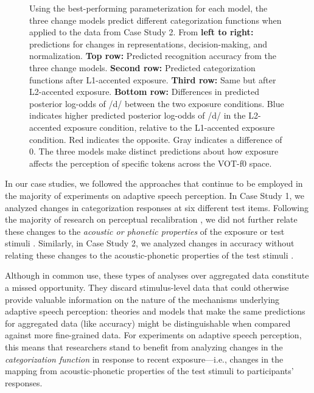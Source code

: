 \documentclass[
  11pt,
  man,floatsintext]{apa6}
\begin{document}
\begin{figure}
{}

\caption{Using the best-performing parameterization for each model, the three change models predict different categorization functions when applied to the data from Case Study 2. From \textbf{left to right:} predictions for changes in representations, decision-making, and normalization. \textbf{Top row:} Predicted recognition accuracy from the three change models. \textbf{Second row:} Predicted categorization functions after L1-accented exposure. \textbf{Third row:} Same but after L2-accented exposure. \textbf{Bottom row:} Differences in predicted posterior log-odds of /d/ between the two exposure conditions. Blue indicates higher predicted posterior log-odds of /d/ in the L2-accented exposure condition, relative to the L1-accented exposure condition. Red indicates the opposite. Gray indicates a difference of 0. The three models make distinct predictions about how exposure affects the perception of specific tokens across the VOT-f0 space.}\label{fig:show-model-categorization-3D-plots-best-performing}
\end{figure}

In our case studies, we followed the approaches that continue to be employed in the majority of experiments on adaptive speech perception. In Case Study 1, we analyzed changes in categorization responses at six different test items. Following the majority of research on perceptual recalibration \autocites[for exceptions, see][]{drouin2016,saltzman-myers2021}, we did not further relate these changes to the \emph{acoustic or phonetic properties} of the exposure or test stimuli \autocites[for related discussion, see also][]{clayards2018,theodore2021}. Similarly, in Case Study 2, we analyzed changes in accuracy without relating these changes to the acoustic-phonetic properties of the test stimuli \autocites[as remains the norm in the field, e.g.,][]{bradlow-bent2008,clarke-garrett2004,sidaras2009,tzeng2016,xie2018jasa,zheng-samuel2020}.

Although in common use, these types of analyses over aggregated data constitute a missed opportunity. They discard stimulus-level data that could otherwise provide valuable information on the nature of the mechanisms underlying adaptive speech perception: theories and models that make the same predictions for aggregated data (like accuracy) might be distinguishable when compared against more fine-grained data. For experiments on adaptive speech perception, this means that researchers stand to benefit from analyzing changes in the \emph{categorization function} in response to recent exposure---i.e., changes in the mapping from acoustic-phonetic properties of the test stimuli to participants' responses.
\end{document}
